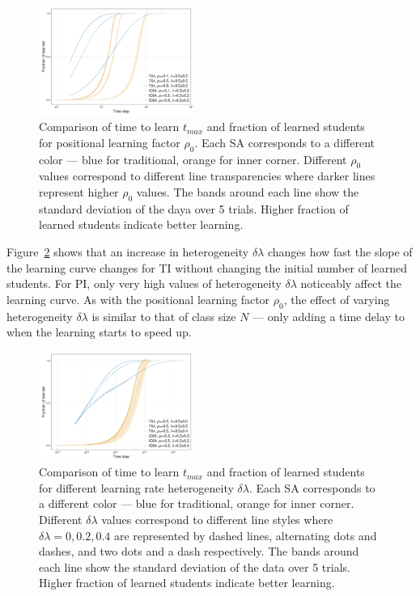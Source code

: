 \documentclass[twocolumn,secnumarabic,amssymb, nobibnotes, aps, prd]{revtex4-2}
\begin{document}
        \begin{figure}[htbp!]
            \centering
            \includegraphics[width=0.45\textwidth]{figures/2D-BPCAIH-analysis/comparison plots/ρ₀.png}
            \caption{Comparison of time to learn $t_{max}$ and fraction of learned students for positional learning factor $\rho_0$.
            Each SA corresponds to a different color --- blue for traditional, orange for inner corner.
            Different $\rho_0$ values correspond to different line transparencies where darker lines represent higher $\rho_0$ values.
            The bands around each line show the standard deviation of the daya over 5 trials.
            Higher fraction of learned students indicate better learning.}
            \label{fig:comparison ρ₀}
        \end{figure}

        Figure~\ref{fig:comparison δλ} shows that an increase in heterogeneity $\delta\lambda$ changes how fast the slope of the learning curve changes for TI without changing the initial number of learned students.
        For PI, only very high values of heterogeneity $\delta\lambda$ noticeably affect the learning curve.
        As with the positional learning factor $\rho_0$, the effect of varying heterogeneity $\delta\lambda$ is similar to that of class size $N$ --- only adding a time delay to when the learning starts to speed up.

        \begin{figure}[htbp!]
            \centering
            \includegraphics[width=0.45\textwidth]{figures/2D-BPCAIH-analysis/comparison plots/δλ.png}
            \caption{Comparison of time to learn $t_{max}$ and fraction of learned students for different learning rate heterogeneity $\delta\lambda$.
            Each SA corresponds to a different color --- blue for traditional, orange for inner corner.
            Different $\delta\lambda$ values correspond to different line styles where $\delta\lambda=0,0.2,0.4$ are represented by dashed lines, alternating dots and dashes, and two dots and a dash respectively.
            The bands around each line show the standard deviation of the data over 5 trials.
            Higher fraction of learned students indicate better learning.}
            \label{fig:comparison δλ}
        \end{figure}
\end{document}
